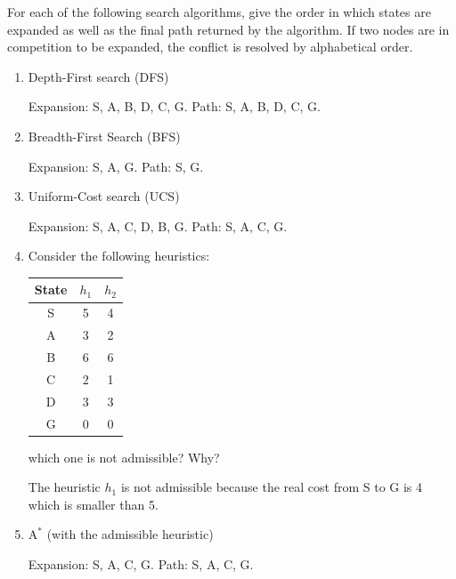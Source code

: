 \documentclass[11pt, a4paper]{article}
\def\Astar{$\text{A}^*$}
\begin{document}
For each of the following search algorithms, give the order in which states are expanded as well as the final path returned by the algorithm. If two nodes are in competition to be expanded, the conflict is resolved by alphabetical order.

\begin{enumerate}
    \item Depth-First search (DFS)
    
    \begin{solution}
        Expansion: S, A, B, D, C, G. Path: S, A, B, D, C, G.
    \end{solution}
    
    \item Breadth-First Search (BFS)
    
    \begin{solution}
        Expansion: S, A, G. Path: S, G.
    \end{solution}
    
    \item Uniform-Cost search (UCS)
    
    \begin{solution}
        Expansion: S, A, C, D, B, G. Path: S, A, C, G.
    \end{solution}
    
    \item Consider the following heuristics:
    \begin{table}[h]
        \centering
        \begin{tabular}{c|cc}
        \toprule
        State & $h_1$ & $h_2$ \\
        \midrule
        S & 5 & 4\\
        A & 3 & 2\\
        B & 6 & 6\\
        C & 2 & 1\\
        D & 3 & 3\\
        G & 0 & 0\\
        \bottomrule
        \end{tabular}
    \end{table}
    which one is not admissible? Why?
    
    \begin{solution}
        The heuristic $h_1$ is not admissible because the real cost from S to G is 4 which is smaller than 5.
    \end{solution}
    
    \item \Astar{} (with the admissible heuristic)
    
    \begin{solution}
        Expansion: S, A, C, G. Path: S, A, C, G.
    \end{solution}
\end{enumerate}
\end{document}
